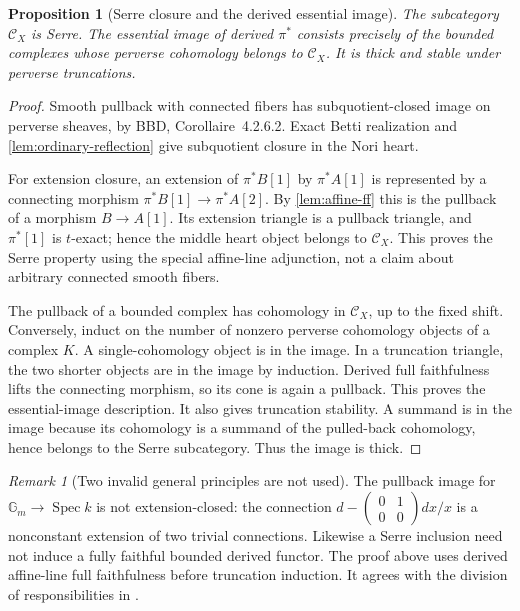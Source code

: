 \documentclass[11pt]{article}
\numberwithin{equation}{section}
\newtheorem{proposition}[proposition]{Proposition}
\theoremstyle{definition}
\theoremstyle{remark}
\newtheorem{remark}[remark]{Remark}
\newcommand{\Gm}{\mathbb G_m}
\newcommand{\Ccal}{\mathcal C}
\newcommand{\Spec}{\operatorname{Spec}}
\begin{document}
\begin{proposition}[Serre closure and the derived essential image]\label{prop:serre-derived}\label{lem:derived-constant}\label{prop:Serre}
The subcategory $\Ccal_X$ is Serre. The essential image of derived
$\pi^*$ consists precisely of the bounded complexes whose perverse
cohomology belongs to $\Ccal_X$. It is thick and stable under perverse
truncations.
\end{proposition}
\begin{proof}
Smooth pullback with connected fibers has subquotient-closed image on
perverse sheaves, by BBD, Corollaire~4.2.6.2. Exact Betti realization and
\cref{lem:ordinary-reflection} give subquotient closure in the Nori heart.

For extension closure, an extension of $\pi^*B[1]$ by $\pi^*A[1]$ is
represented by a connecting morphism
$\pi^*B[1]\to\pi^*A[2]$. By \cref{lem:affine-ff} this is the pullback
of a morphism $B\to A[1]$. Its extension triangle is a pullback triangle,
and $\pi^*[1]$ is $t$-exact; hence the middle heart object belongs to
$\Ccal_X$. This proves the Serre property using the special affine-line
adjunction, not a claim about arbitrary connected smooth fibers.

The pullback of a bounded complex has cohomology in $\Ccal_X$, up to the
fixed shift. Conversely, induct on the number of nonzero perverse
cohomology objects of a complex $K$. A single-cohomology object is in the
image. In a truncation triangle, the two shorter objects are in the image
by induction. Derived full faithfulness lifts the connecting morphism, so
its cone is again a pullback. This proves the essential-image description.
It also gives truncation stability. A summand is in the image because its
cohomology is a summand of the pulled-back cohomology, hence belongs to the
Serre subcategory. Thus the image is thick.
\end{proof}

\begin{remark}[Two invalid general principles are not used]
The pullback image for $\Gm\to\Spec k$ is not extension-closed: the
connection $d-\left(\begin{smallmatrix}0&1\\0&0\end{smallmatrix}\right)
dx/x$ is a nonconstant extension of two trivial connections. Likewise a
Serre inclusion need not induce a fully faithful bounded derived functor.
The proof above uses derived affine-line full faithfulness before
truncation induction. It agrees with the division of responsibilities in
\cite[Proposition~7.2 and \S7.3]{Virk}.
\end{remark}
\end{document}
